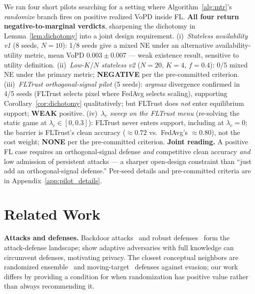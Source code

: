 \documentclass{article}
\begin{document}
We ran four short pilots searching for a setting where Algorithm~\ref{alg:mtr}'s \emph{randomize} branch fires on positive realized VoPD inside FL. \textbf{All four return negative-to-marginal verdicts}, sharpening the dichotomy in Lemma~\ref{lem:dichotomy} into a joint design requirement. (i)~\emph{Stateless availability v1} (8 seeds, $N{=}10$): 1/8 seeds give a mixed NE under an alternative availability-utility metric, mean VoPD $0.003 \pm 0.007$ --- weak existence result, sensitive to utility definition. (ii)~\emph{Low-$K/N$ stateless v2} ($N{=}20$, $K{=}4$, $f{=}0.4$): 0/5 mixed NE under the primary metric; \textbf{NEGATIVE} per the pre-committed criterion. (iii)~\emph{FLTrust orthogonal-signal pilot} (5 seeds): \emph{argmax} divergence confirmed in 4/5 seeds (FLTrust selects pixel where FedAvg selects scaling), supporting Corollary~\ref{cor:dichotomy} qualitatively; but FLTrust does \emph{not} enter equilibrium support; \textbf{WEAK} positive. (iv)~\emph{$\lambda_c$ sweep on the FLTrust menu} (re-solving the static game at $\lambda_c \in [0, 0.3]$): FLTrust never enters support, including at $\lambda_c=0$; the barrier is FLTrust's clean accuracy (${\approx}0.72$ vs.\ FedAvg's ${\approx}0.80$), not the cost weight; \textbf{NONE} per the pre-committed criterion. \textbf{Joint reading.} A positive FL case requires an orthogonal-signal defense \emph{and} competitive clean accuracy \emph{and} low admission of persistent attacks --- a sharper open-design constraint than ``just add an orthogonal-signal defense.'' Per-seed details and pre-committed criteria are in Appendix~\ref{app:pilot_details}.

\section{Related Work}
\label{sec:related}

\textbf{Attacks and defenses.} Backdoor attacks~\citep{chen2017targeted,bagdasaryan2020backdoor,wang2020attack,xie2019dba} and robust defenses~\citep{pillutla2019robust,sun2019can,blanchard2017machine} form the attack-defense landscape; \citet{bhagoji2019analyzing} show adaptive adversaries with full knowledge can circumvent defenses, motivating privacy. The closest conceptual neighbors are randomized ensemble~\citep{xie2018mitigating} and moving-target~\citep{liu2018towards} defenses against evasion; our work differs by providing a condition for when randomization has positive value rather than always recommending it.
\end{document}
